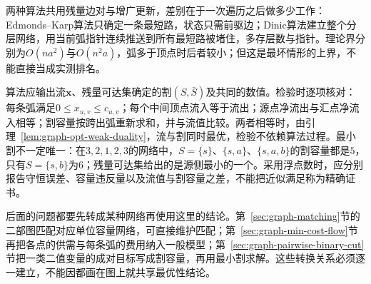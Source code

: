 两种算法共用残量边对与增广更新，差别在于一次遍历之后做多少工作：Edmonds--Karp算法只确定一条最短路，状态只需前驱边；Dinic算法建立整个分层网络，用当前弧指针连续推送到所有最短路被堵住，多存层数与指针。理论界分别为$O(na^2)$与$O(n^2a)$，弧多于顶点时后者较小；但这是最坏情形的上界，不能直接当成实测排名。

算法应输出流$\bm x$、残量可达集确定的割$(S,\bar S)$及共同的数值。检验时逐项核对：每条弧满足$0\leq x_{u,v}\leq c_{u,v}$；每个中间顶点流入等于流出；源点净流出与汇点净流入相等；割容量按跨出弧重新求和，并与流值比较。两者相等时，由引理~\ref{lem:graph-opt-weak-duality}，流与割同时最优，检验不依赖算法过程。最小割不一定唯一：在$3,2,1,2,3$的网络中，$S=\{s\}$、$\{s,a\}$、$\{s,a,b\}$的割容量都是$5$，只有$S=\{s,b\}$为$6$；残量可达集给出的是源侧最小的一个。采用浮点数时，应分别报告守恒误差、容量违反量以及流值与割容量之差，不能把近似满足称为精确证书。

后面的问题都要先转成某种网络再使用这里的结论。第~\ref{sec:graph-matching}节的二部图匹配对应单位容量网络，可直接维护匹配；第~\ref{sec:graph-min-cost-flow}节再把各点的供需与每条弧的费用纳入一般模型；第~\ref{sec:graph-pairwise-binary-cut}节把一类二值变量的成对目标写成割容量，再用最小割求解。这些转换关系必须逐一建立，不能因都画在图上就共享最优性结论。

